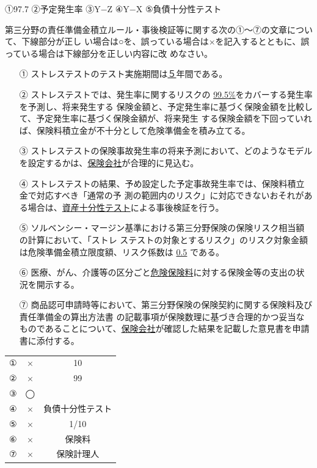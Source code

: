 \documentclass[report,gutter=10mm,fore-edge=10mm,uplatex,dvipdfmx]{jlreq}
\begin{document}
①97.7
②予定発生率
③Y−Z
④Y−X
⑤負債十分性テスト

第三分野の責任準備金積立ルール・事後検証等に関する次の①～⑦の文章について、下線部分が正し
い場合は○を、誤っている場合は×を記入するとともに、誤っている場合は下線部分を正しい内容に改
めなさい。
\begin{itemize}
 \item [①] ストレステストのテスト実施期間は\underline{５}年間である。
 \item [②] ストレステストでは、発生率に関するリスクの \underline{99.5\%}をカバーする発生率を予測し、将来発生する
保険金額と、予定発生率に基づく保険金額を比較して、予定発生率に基づく保険金額が、将来発生
する保険金額を下回っていれば、保険料積立金が不十分として危険準備金を積み立てる。
 \item [③] ストレステストの保険事故発生率の将来予測において、どのようなモデルを設定するかは、\underline{保険会社}が合理的に見込む。
 \item [④] ストレステストの結果、予め設定した予定事故発生率では、保険料積立金で対応すべき「通常の予
測の範囲内のリスク」に対応できないおそれがある場合は、\underline{資産十分性テスト}による事後検証を行う。
 \item [⑤] ソルベンシー・マージン基準における第三分野保険の保険リスク相当額の計算において、「ストレ
ステストの対象とするリスク」のリスク対象金額は危険準備金積立限度額、リスク係数は \underline{0.5} である。
 \item [⑥] 医療、がん、介護等の区分ごと\underline{危険保険料}に対する保険金等の支出の状況を開示する。
 \item [⑦] 商品認可申請時等において、第三分野保険の保険契約に関する保険料及び責任準備金の算出方法書
の記載事項が保険数理に基づき合理的かつ妥当なものであることについて、\underline{保険会社}が確認した結果を記載した意見書を申請書に添付する。

\end{itemize}

\begin{tabular}{|c|c|c|}
 \hline
 ①&× & 10 \\
 ②&×& 99\\
 ③&◯& \\
 ④&×& 負債十分性テスト\\
 ⑤&× & 1/10 \\
 ⑥&× & 保険料 \\
 ⑦&× & 保険計理人 \\
 \hline
\end{tabular}
\end{document}
